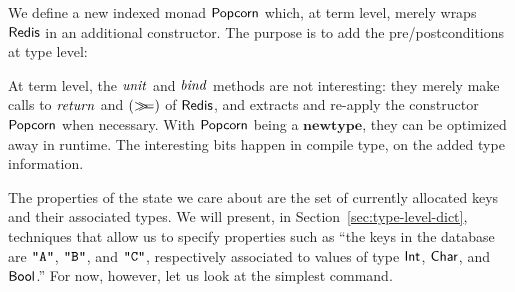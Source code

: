 We define a new indexed monad \ensuremath{\Conid{Popcorn}} which, at term level, merely wraps
\ensuremath{\Conid{Redis}} in an additional constructor. The purpose is to add the
pre/postconditions at type level:
\resethooks
At term level, the \ensuremath{\Varid{unit}} and \ensuremath{\Varid{bind}} methods are not interesting: they merely
make calls to \ensuremath{\Varid{return}} and \ensuremath{(\bind )} of \ensuremath{\Conid{Redis}}, and extracts and re-apply the constructor \ensuremath{\Conid{Popcorn}} when necessary. With \ensuremath{\Conid{Popcorn}} being a \ensuremath{\mathbf{newtype}}, they
can be optimized away in runtime. The interesting bits happen in compile type,
on the added type information.

The properties of the state we care about are the set of currently allocated
keys and their associated types. We will present, in Section~\ref{sec:type-level-dict}, techniques that allow us to specify
properties such as ``the keys in the database are \ensuremath{\text{\tt \char34 A\char34}}, \ensuremath{\text{\tt \char34 B\char34}}, and \ensuremath{\text{\tt \char34 C\char34}},
respectively associated to values of type \ensuremath{\Conid{Int}}, \ensuremath{\Conid{Char}}, and \ensuremath{\Conid{Bool}}.''
For now, however, let us look at the simplest \Redis{} command.

